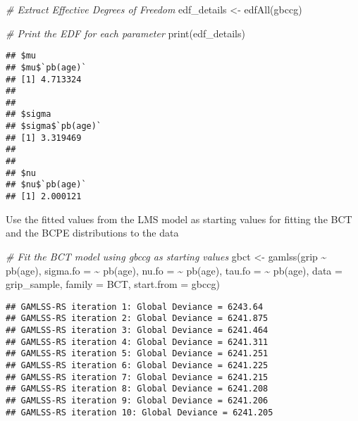 \documentclass[
]{article}
\newenvironment{Shaded}{\begin{snugshade}}{\end{snugshade}}
\newcommand{\AttributeTok}[1]{\textcolor[rgb]{0.77,0.63,0.00}{#1}}
\newcommand{\CommentTok}[1]{\textcolor[rgb]{0.56,0.35,0.01}{\textit{#1}}}
\newcommand{\FunctionTok}[1]{\textcolor[rgb]{0.00,0.00,0.00}{#1}}
\newcommand{\NormalTok}[1]{#1}
\newcommand{\OtherTok}[1]{\textcolor[rgb]{0.56,0.35,0.01}{#1}}
\newcommand{\SpecialCharTok}[1]{\textcolor[rgb]{0.00,0.00,0.00}{#1}}
\begin{document}
\begin{Shaded}
\begin{Highlighting}[]
\CommentTok{\# Extract Effective Degrees of Freedom}
\NormalTok{edf\_details }\OtherTok{\textless{}{-}} \FunctionTok{edfAll}\NormalTok{(gbccg)}

\CommentTok{\# Print the EDF for each parameter}
\FunctionTok{print}\NormalTok{(edf\_details)}
\end{Highlighting}
\end{Shaded}

\begin{verbatim}
## $mu
## $mu$`pb(age)`
## [1] 4.713324
## 
## 
## $sigma
## $sigma$`pb(age)`
## [1] 3.319469
## 
## 
## $nu
## $nu$`pb(age)`
## [1] 2.000121
\end{verbatim}

Use the fitted values from the LMS model as starting values for fitting
the BCT and the BCPE distributions to the data

\begin{Shaded}
\begin{Highlighting}[]
\CommentTok{\# Fit the BCT model using gbccg as starting values}
\NormalTok{gbct }\OtherTok{\textless{}{-}} \FunctionTok{gamlss}\NormalTok{(grip }\SpecialCharTok{\textasciitilde{}} \FunctionTok{pb}\NormalTok{(age),}
               \AttributeTok{sigma.fo =} \SpecialCharTok{\textasciitilde{}} \FunctionTok{pb}\NormalTok{(age),}
               \AttributeTok{nu.fo =} \SpecialCharTok{\textasciitilde{}} \FunctionTok{pb}\NormalTok{(age),}
               \AttributeTok{tau.fo =} \SpecialCharTok{\textasciitilde{}} \FunctionTok{pb}\NormalTok{(age),}
               \AttributeTok{data =}\NormalTok{ grip\_sample,}
               \AttributeTok{family =}\NormalTok{ BCT,}
               \AttributeTok{start.from =}\NormalTok{ gbccg)}
\end{Highlighting}
\end{Shaded}

\begin{verbatim}
## GAMLSS-RS iteration 1: Global Deviance = 6243.64 
## GAMLSS-RS iteration 2: Global Deviance = 6241.875 
## GAMLSS-RS iteration 3: Global Deviance = 6241.464 
## GAMLSS-RS iteration 4: Global Deviance = 6241.311 
## GAMLSS-RS iteration 5: Global Deviance = 6241.251 
## GAMLSS-RS iteration 6: Global Deviance = 6241.225 
## GAMLSS-RS iteration 7: Global Deviance = 6241.215 
## GAMLSS-RS iteration 8: Global Deviance = 6241.208 
## GAMLSS-RS iteration 9: Global Deviance = 6241.206 
## GAMLSS-RS iteration 10: Global Deviance = 6241.205
\end{verbatim}
\end{document}
